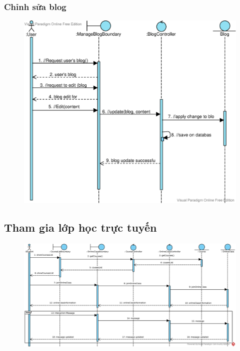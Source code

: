 \documentclass[./../main_file.tex]{subfiles}
\begin{document}
	\subsubsection{Chỉnh sửa blog}
	\begin{figure}[H]
		\centering
		\includegraphics[width=.9\linewidth]{./images/sequence_diagram/3_3_5_BlogUpdate.eps}
	\end{figure}
	
	\subsection{Tham gia lớp học trực tuyến}
	\begin{figure}[H]
		\centering
		\includegraphics[width=\linewidth]{./images/sequence_diagram/3_4_join_online_class.eps}
	\end{figure}
	
\end{document}
